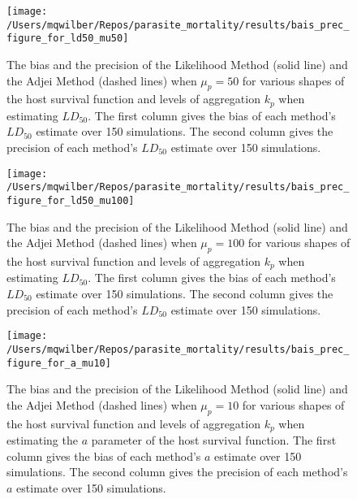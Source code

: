 \documentclass[12pt, a4paper]{article}
\begin{document}
\begin{figure}

    \texttt{[image: /Users/mqwilber/Repos/parasite\_mortality/results/bais\_prec\_figure\_for\_ld50\_mu50]}

    \caption{The bias and the precision of the Likelihood Method (solid line) and the Adjei Method (dashed lines) when $\mu_p = 50$ for various shapes of the host survival function and levels of aggregation $k_p$ when estimating $LD_{50}$.  The first column gives the bias of each method's $LD_{50}$ estimate over 150 simulations. The second column gives the precision of each method's $LD_{50}$ estimate over 150 simulations.}

    \label{fig:biasld50_50}

\end{figure}

\begin{figure}

    \texttt{[image: /Users/mqwilber/Repos/parasite\_mortality/results/bais\_prec\_figure\_for\_ld50\_mu100]}

    \caption{The bias and the precision of the Likelihood Method (solid line) and the Adjei Method (dashed lines) when $\mu_p = 100$ for various shapes of the host survival function and levels of aggregation $k_p$ when estimating $LD_{50}$.  The first column gives the bias of each method's $LD_{50}$ estimate over 150 simulations. The second column gives the precision of each method's $LD_{50}$ estimate over 150 simulations.}

    \label{fig:biasld50_100}

\end{figure}

\begin{figure}

    \texttt{[image: /Users/mqwilber/Repos/parasite\_mortality/results/bais\_prec\_figure\_for\_a\_mu10]}

    \caption{The bias and the precision of the Likelihood Method (solid line) and the Adjei Method (dashed lines) when $\mu_p = 10$ for various shapes of the host survival function and levels of aggregation $k_p$ when estimating the $a$ parameter of the host survival function.  The first column gives the bias of each method's $a$ estimate over 150 simulations. The second column gives the precision of each method's $a$ estimate over 150 simulations.}

    \label{fig:biasa_10}

\end{figure}
\end{document}
